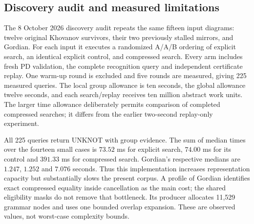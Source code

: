 \subsection{Discovery audit and measured limitations}

The 8 October 2026 discovery audit repeats the same fifteen input diagrams:
twelve original Khovanov survivors, their two previously stalled mirrors,
and Gordian. For each input it executes a randomized A/A/B ordering of
explicit search, an identical explicit control, and compressed search.
Every arm includes fresh PD validation, the complete recognition query
and independent certificate replay. One warm-up round is excluded and
five rounds are measured, giving 225 measured queries. The local group
allowance is ten seconds, the global allowance twelve seconds, and each
search/replay receives ten million abstract work units. The larger time
allowance deliberately permits comparison of completed compressed searches;
it differs from the earlier two-second replay-only experiment.

All 225 queries return UNKNOT with group evidence. The sum of median
times over the fourteen small cases is $73.52$ ms for explicit search,
$74.00$ ms for its control and $391.33$ ms for compressed search. Gordian's
respective medians are $1.247$, $1.252$ and $7.076$ seconds. Thus this
implementation increases representation capacity but substantially slows
the present corpus. A profile of Gordian identifies exact compressed
equality inside cancellation as the main cost; the shared eligibility
masks do not remove that bottleneck. Its producer allocates 11,529 grammar
nodes and uses one bounded overlap expansion. These are observed values,
not worst-case complexity bounds.

